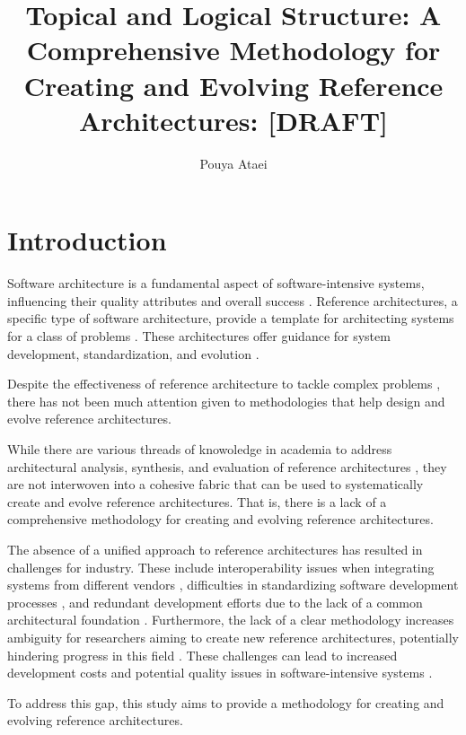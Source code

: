 \documentclass[12pt,a4paper]{article}
\title{Topical and Logical Structure: A Comprehensive Methodology for Creating and Evolving Reference Architectures: [DRAFT]}
\author{Pouya Ataei}
\date{}
\begin{document}
\maketitle

\section{Introduction}

Software architecture is a fundamental aspect of software-intensive systems, influencing their quality attributes and overall success \cite{bass2012software}. Reference architectures, a specific type of software architecture, provide a template for architecting systems for a class of problems \cite{angelov2012framework}. These architectures offer guidance for system development, standardization, and evolution \cite{cloutier2010concept}.


Despite the effectiveness of reference architecture to tackle complex problems \cite{angelov2012designing}, there has not been much attention given to methodologies that help design and evolve reference architectures. 

While there are various threads of knowoledge in academia to address architectural analysis, synthesis, and evaluation of reference architectures \cite{dobrica2008approach,galster2011empirically,muller2008right}, they are not interwoven into a cohesive fabric that can be used to systematically create and evolve reference architectures. That is, there is a lack of a comprehensive methodology for creating and evolving reference architectures.

The absence of a unified approach to reference architectures has resulted in challenges for industry. These include interoperability issues when integrating systems from different vendors \cite{weyrich2015reference}, difficulties in standardizing software development processes \cite{garciamoreno2020microservices}, and redundant development efforts due to the lack of a common architectural foundation \cite{nakagawa2011aspect}. Furthermore, the lack of a clear methodology increases ambiguity for researchers aiming to create new reference architectures, potentially hindering progress in this field \cite{Angelov2012}. These challenges can lead to increased development costs and potential quality issues in software-intensive systems \cite{antinyan2020revealing}.

To address this gap, this study aims to provide a methodology for creating and evolving reference architectures.
\end{document}

